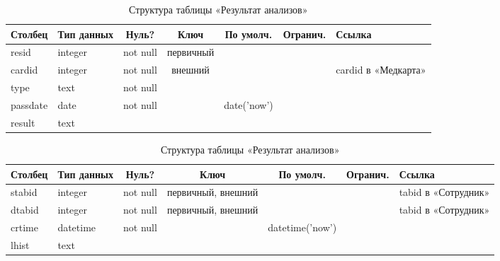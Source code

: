 \documentclass[14pt,a4paper,russian]{extreport}
\begin{document}
\begin{table}[h!]
    \caption{ } 
    \begin{subtable}[t]{\textwidth}
    \caption{Структура таблицы «Результат анализов»}
    \begin{tabularx}{\textwidth}{| X | X | c | c | c | c | X |}
        \hline
        \textbf{Столбец} & \textbf{Тип данных} & \textbf{Нуль?} & \textbf{Ключ} & \textbf{По
        умолч.} & \textbf{Огранич.} & \textbf{Ссылка} \\ \hline
        resid & integer & not null & первичный & & & \\ \hline
        cardid & integer & not null & внешний & & & cardid в «Медкарта» \\ \hline
        type & text & not null & & & & \\ \hline
        passdate & date & not null & & date('now') & & \\ \hline
        result & text & & & & & \\ \hline
    \end{tabularx}
    \end{subtable}
    \label{table:res}
\end{table}

\begin{table}[h!]
    \caption{ } 
    \begin{subtable}[t]{\textwidth}
    \caption{Структура таблицы «Результат анализов»}
    \begin{tabularx}{\textwidth}{| X | X | c | c | c | c | X |}
        \hline
        \textbf{Столбец} & \textbf{Тип данных} & \textbf{Нуль?} & \textbf{Ключ} & \textbf{По
        умолч.} & \textbf{Огранич.} & \textbf{Ссылка} \\ \hline
        stabid & integer & not null & первичный, внешний & & & tabid в «Сотрудник» \\ \hline
        dtabid & integer & not null & первичный, внешний & & & tabid в «Сотрудник» \\ \hline
        crtime & datetime & not null & & datetime('now') &  & \\ \hline
        lhist & text & & & & & \\ \hline
    \end{tabularx}
    \end{subtable}
    \label{table:emplink}
\end{table}
\end{document}
